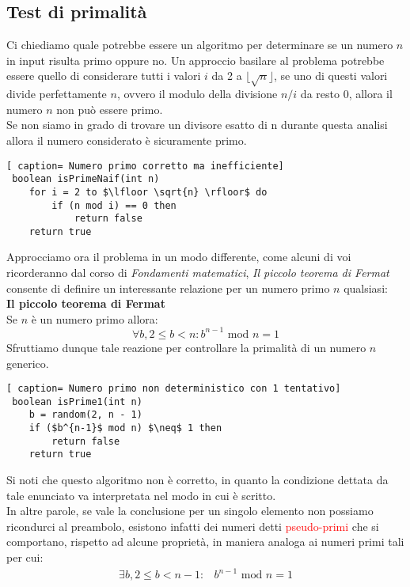 \documentclass[../cheatSheetAlgoritmi.tex]{subfiles}
\begin{document}
\subsection{Test di primalità}
Ci chiediamo quale potrebbe essere un algoritmo per determinare se un numero $n$ in input risulta primo oppure no. 
Un approccio basilare al problema potrebbe essere quello di considerare tutti i valori $i$ da 2 a $\lfloor \sqrt{n} \rfloor$, se uno di questi valori divide perfettamente $n$, ovvero il modulo della divisione $n/i$ da resto $0$, allora il numero $n$ non può essere primo. \\
Se non siamo in grado di trovare un divisore esatto di n durante questa analisi allora il numero considerato è sicuramente primo. 
 \begin{lstlisting}[ caption= Numero primo corretto ma inefficiente]
 boolean isPrimeNaif(int n)
 	for i = 2 to $\lfloor \sqrt{n} \rfloor$ do
 		if (n mod i) == 0 then
 			return false
 	return true
\end{lstlisting}
Approcciamo ora il problema in un modo differente, come alcuni di voi ricorderanno dal corso di \emph{Fondamenti matematici}, \emph{Il piccolo teorema di Fermat} consente di definire un interessante relazione per un numero primo $n$ qualsiasi: \\
\textbf{Il piccolo teorema di Fermat} \\
Se $n$ è un numero primo allora:
\begin{equation*}
    \forall b, 2 \leq b < n : \text{$b^{n-1}$ mod $n = 1$}
\end{equation*}
Sfruttiamo dunque tale reazione per controllare la primalità di un numero $n$ generico.
 \begin{lstlisting}[ caption= Numero primo non deterministico con 1 tentativo]
 boolean isPrime1(int n)
 	b = random(2, n - 1)
 	if ($b^{n-1}$ mod n) $\neq$ 1 then
 		return false
 	return true
\end{lstlisting}
Si noti che questo algoritmo non è corretto, in quanto la condizione dettata da tale enunciato va interpretata nel modo in cui è scritto. \\
In altre parole, se vale la conclusione per un singolo elemento non possiamo ricondurci al preambolo, esistono infatti dei numeri detti \textcolor{red}{pseudo-primi} che si comportano, rispetto ad alcune proprietà, in maniera analoga ai numeri primi tali per cui: 
\begin{align*}
    \exists b, 2 \leq b < n - 1: & \text{$b^{n-1}$ mod $n = 1$}
\end{align*}
\end{document}
